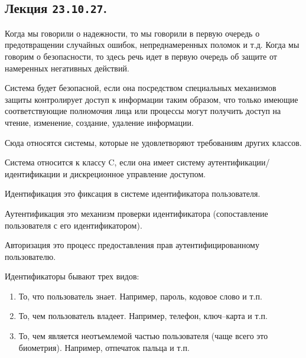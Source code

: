\subsection{%
  Лекция \texttt{23.10.27}.%
}


Когда мы говорили о надежности, то мы говорили в первую очередь о предотвращении
случайных ошибок, непреднамеренных поломок и т.д. Когда мы говорим о
безопасности, то здесь речь идет в первую очередь об защите от намеренных
негативных действий.

\begin{definition}
  Система будет безопасной, если она посредством специальных механизмов защиты
  контролирует доступ к информации таким образом, что только имеющие
  соответствующие полномочия лица или процессы могут получить доступ на чтение,
  изменение, создание, удаление информации.
\end{definition}



Сюда относятся системы, которые не удовлетворяют требованиям других классов.


Система относится к классу C, если она имеет систему
аутентификации/идентификации и дискреционное управление доступом.

\begin{definition}
  Идентификация это фиксация в системе идентификатора пользователя.
\end{definition}

\begin{definition}
  Аутентификация это механизм проверки идентификатора (сопоставление
  пользователя с его идентификатором).
\end{definition}

\begin{definition}
  Авторизация это процесс предоставления прав аутентифицированному пользователю.
\end{definition}

Идентификаторы бывают трех видов:

\begin{enumerate}
\item
  То, что пользователь знает. Например, пароль, кодовое слово и т.п.

\item
  То, чем пользователь владеет. Например, телефон, ключ--карта и т.п.

\item
  То, чем является неотъемлемой частью пользователя (чаще всего это биометрия).
  Например, отпечаток пальца и т.п.
\end{enumerate}

